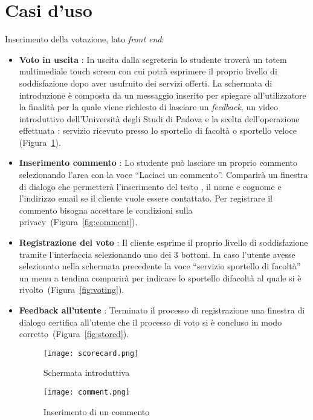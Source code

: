 \section{Casi d'uso}
Inserimento della votazione, lato \emph{front end}:
\begin{itemize}
  \item \textbf{Voto in uscita} : In uscita dalla segreteria lo studente
  troverà un totem multimediale touch screen con cui potrà esprimere il
  proprio livello di soddisfazione dopo aver usufruito dei servizi offerti. La
  schermata di introduzione è composta da un messaggio inserito per spiegare
  all'utilizzatore la finalità per la quale viene richiesto di lasciare un
  \emph{feedback}, un video introduttivo dell'Università degli Studi di Padova
  e la scelta dell'operazione effettuata : servizio ricevuto presso lo sportello
  di facoltà o sportello veloce (Figura~\ref{fig:scorecard}).
  \item \textbf{Inserimento commento} : Lo studente può lasciare un proprio
  commento selezionando l'area con la voce ``Laciaci un commento''. Comparirà un finestra di dialogo che permetterà
  l'inserimento del testo , il nome e cognome e l'indirizzo email se il cliente
  vuole essere contattato. Per registrare il commento bisogna accettare le
  condizioni sulla privacy~(Figura~\ref{fig:comment}).
  \item \textbf{Registrazione del voto} : Il cliente esprime il proprio livello
  di soddisfazione tramite l’interfaccia selezionando uno dei 3 bottoni. In caso l'utente avesse
  selezionato nella schermata precedente la voce ``servizio sportello di
  facoltà'' un menu a tendina comparirà per indicare lo sportello difacoltà al
  quale si è rivolto~(Figura~\ref{fig:voting}).
  \item \textbf{Feedback all'utente} : Terminato il processo di registrazione
  una finestra di dialogo certifica all'utente che il processo di voto si è
  concluso in modo corretto~(Figura~\ref{fig:stored}).
    \begin{figure}[!h]
    \begin{center}
        \texttt{[image: scorecard.png]}
        \caption{Schermata introduttiva}
        \label{fig:scorecard}
    \end{center}
  \end{figure}
   \begin{figure}[!h]
    \begin{center}
        \texttt{[image: comment.png]}
        \caption{Inserimento di un commento}

\end{center}
\end{figure}
\end{itemize}
